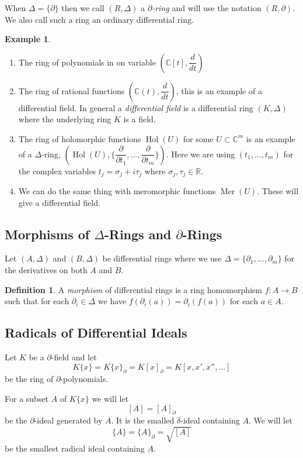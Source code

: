 \documentclass[12pt]{book}
\numberwithin{equation}{section}
\theoremstyle{definition}
\newtheorem{definition}[theorem]{Definition}
\newtheorem{example}[theorem]{Example}
\theoremstyle{remark}
\newcommand{\RR}{\mathbb{R}}
\newcommand{\CC}{\mathbb{C}}
\newcommand{\hol}{\operatorname{Hol}}
\newcommand{\Mer}{\operatorname{Mer}}
\begin{document}
When $\Delta = \lbrace \partial \rbrace$ then we call $(R,\Delta)$ a \emph{$\partial$-ring} and will use the notation $(R,\partial)$. 
We also call such a ring an ordinary differential ring. 


\begin{example}
	\begin{enumerate}
		\item The ring of polynomials in on variable $(\CC[t],\dfrac{d}{dt})$ 
		\item The ring of rational functions $(\CC(t), \dfrac{d}{dt})$, this is an example of a differential field. 
		In general a \emph{differential field} is a differential ring $(K,\Delta)$ where the underlying ring $K$ is a field. 
		\item The ring of holomorphic functions $\hol(U)$ for some $U\subset \CC^m$ is an example of a $\Delta$-ring, $(\hol(U), \lbrace \dfrac{\partial}{\partial t_1}, \ldots, \dfrac{\partial}{\partial t_m}\rbrace )$. 
		Here we are using $(t_1,\ldots,t_m)$ for the complex variables $t_j = \sigma_j + i \tau_j$ where $\sigma_j,\tau_j \in \RR$. 
		\item We can do the same thing with meromorphic functions $\Mer(U)$. These will give a differential field. 
	\end{enumerate}
\end{example}

\subsection{Morphisms of $\Delta$-Rings and $\partial$-Rings}
Let $(A,\Delta)$ and $(B,\Delta)$ be differential rings where we use $\Delta = \lbrace \partial_1,\ldots,\partial_m\rbrace$ for the derivatives on both $A$ and $B$.
\begin{definition}
A \emph{morphism} of differential rings is a ring homomorphism $f:A\to B$ such that for each $\partial_i \in \Delta$ we have $f(\partial_i(a)) = \partial_i(f(a))$ for each $a\in A$. 
\end{definition}

\subsection{Radicals of Differential Ideals}
Let $K$ be a $\partial$-field and let 
$$K\lbrace x \rbrace = K\lbrace x \rbrace_{\partial} = K[x]_{\partial}=K[x,x',x'',\ldots]$$ 
be the ring of $\partial$-polynomials.

For a subset $A$ of $K\lbrace x \rbrace$ we will let 
$$ [A]=[A]_{\partial} $$
be the $\partial$-ideal generated by $A$. 
It is the smalled $\delta$-ideal containing $A$. 
We will let 
$$ \lbrace A \rbrace = \lbrace A \rbrace_{\partial} = \sqrt{[A]} $$
be the smallest radical ideal containing $A$. 
\end{document}
